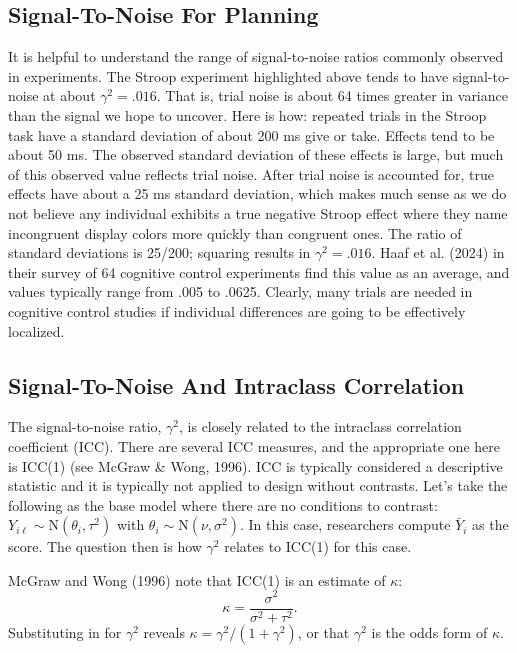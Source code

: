 \documentclass[
  ,man]{apa6}
\begin{document}
\subsection{Signal-To-Noise For Planning}\label{signal-to-noise-for-planning}

It is helpful to understand the range of signal-to-noise ratios commonly observed in experiments. The Stroop experiment highlighted above tends to have signal-to-noise at about \(\gamma^2=.016\). That is, trial noise is about 64 times greater in variance than the signal we hope to uncover. Here is how: repeated trials in the Stroop task have a standard deviation of about 200 ms give or take. Effects tend to be about 50 ms. The observed standard deviation of these effects is large, but much of this observed value reflects trial noise. After trial noise is accounted for, true effects have about a 25 ms standard deviation, which makes much sense as we do not believe any individual exhibits a true negative Stroop effect where they name incongruent display colors more quickly than congruent ones. The ratio of standard deviations is 25/200; squaring results in \(\gamma^2=.016\). Haaf et al. (2024) in their survey of 64 cognitive control experiments find this value as an average, and values typically range from .005 to .0625. Clearly, many trials are needed in cognitive control studies if individual differences are going to be effectively localized.

\subsection{Signal-To-Noise And Intraclass Correlation}\label{signal-to-noise-and-intraclass-correlation}

The signal-to-noise ratio, \(\gamma^2\), is closely related to the intraclass correlation coefficient (ICC). There are several ICC measures, and the appropriate one here is ICC(1) (see McGraw \& Wong, 1996). ICC is typically considered a descriptive statistic and it is typically not applied to design without contrasts. Let's take the following as the base model where there are no conditions to contrast: \(Y_{i\ell}\sim \mbox{N}(\theta_i,\tau^2)\) with \(\theta_i\sim \mbox{N}(\nu,\sigma^2)\). In this case, researchers compute \(\bar{Y}_i\) as the score. The question then is how \(\gamma^2\) relates to ICC(1) for this case.

McGraw and Wong (1996) note that ICC(1) is an estimate of \(\kappa\):
\[
\kappa = \frac{\sigma^2}{\sigma^2 + \tau^2}.
\]
Substituting in for \(\gamma^2\) reveals \(\kappa=\gamma^2/(1+\gamma^2)\), or that \(\gamma^2\) is the odds form of \(\kappa\).
\end{document}

